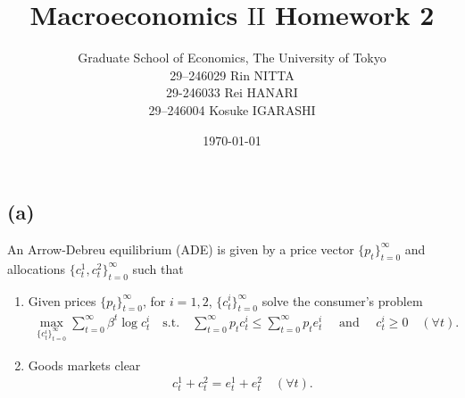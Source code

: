 \documentclass{ltjsarticle}
\title{Macroeconomics $\mathrm{II}$ Homework 2}
\date{\today}
\author{Graduate School of Economics, The University of Tokyo\\[4mm]29--246029 Rin NITTA\\ 29-246033 Rei HANARI \\ 29--246004 Kosuke IGARASHI
}
\begin{document}
\maketitle



\section{} %

\subsection*{(a)}
An Arrow-Debreu equilibrium (ADE) is given by a price vector $\{p_t\}_{t=0}^\infty$ and allocations $\{c_t^1, c_t^2\}_{t=0}^\infty$ such that
\begin{enumerate}
    \item Given prices $\{p_t\}_{t=0}^\infty$, for $i = 1,2$, $\{c_t^i\}_{t=0}^\infty$ solve the consumer's problem
    \begin{gather*}
        \max_{\{c_t^i\}_{t=0}^\infty} \sum_{t=0}^\infty \beta^t \log c_t^i \quad \text{s.t.} \quad \sum_{t=0}^\infty p_t c_t^i \leq \sum_{t=0}^\infty p_t e_t^i \quad \text{ and } \quad c_t^i \geq 0 \quad ( \forall t).
    \end{gather*}
    \item Goods markets clear
    \begin{gather*}
        c_t^1 + c_t^2 = e_t^1 + e_t^2 \quad ( \forall t).
    \end{gather*}
\end{enumerate}
\end{document}
